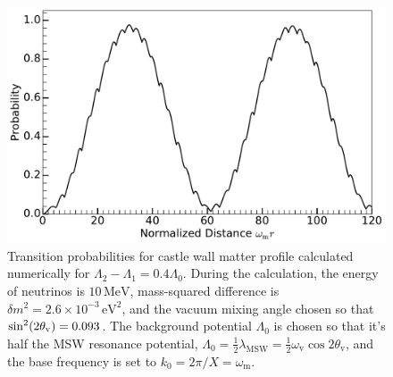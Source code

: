 \begin{figure}[!htbp]
        \includegraphics[width=\columnwidth]{chapters/assets/rabi/castle-wall-1}%
    \caption{Transition probabilities for castle wall matter profile calculated numerically for $\Lambda_2-\Lambda_1=0.4 \Lambda_0$. During the calculation, the energy of neutrinos is $10\,\mathrm{MeV}$, mass-squared difference is $\delta m^2=2.6\times 10^{-3}\,\mathrm{eV^2}$, and the vacuum mixing angle chosen so that $\sin^2(2\theta_\mathrm v)=0.093$. The background potential $\Lambda_0$ is chosen so that it's half the MSW resonance potential, $\Lambda_0 = \frac{1}{2}\lambda_{\mathrm{MSW}}=\frac{1}{2}\omega_{\mathrm{v}}\cos 2\theta_{\mathrm v}$, and the base frequency is set to $k_0 = 2\pi/X = \omega_{\mathrm{m}}$.
                 }
    \label{fig-akhmedovOscPlt}
\end{figure}


